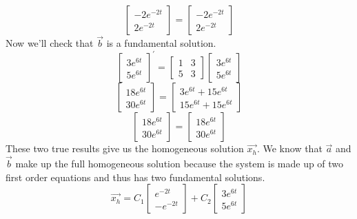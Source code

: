 \begin{equation*}
	\begin{bmatrix}
	-2e^{-2t} \\
	2e^{-2t}
	\end{bmatrix} = \begin{bmatrix}
		-2e^{-2t} \\
		2e^{-2t}
	\end{bmatrix}
\end{equation*}
Now we'll check that $\vec{b}$ is a fundamental solution.
\begin{equation*}
	\begin{bmatrix}
		3e^{6t} \\
		5e^{6t}
	\end{bmatrix}^\prime = \begin{bmatrix}
		1 & 3 \\
		5 & 3
	\end{bmatrix} \begin{bmatrix}
		3e^{6t} \\
		5e^{6t}
	\end{bmatrix}
\end{equation*}
\begin{equation*}
	\begin{bmatrix}
		18e^{6t} \\
		30e^{6t}
	\end{bmatrix} = \begin{bmatrix}
		3e^{6t} + 15e^{6t} \\
		15e^{6t} + 15e^{6t}
	\end{bmatrix}
\end{equation*}
\begin{equation*}
	\begin{bmatrix}
		18e^{6t} \\
		30e^{6t}
	\end{bmatrix} = \begin{bmatrix}
		18e^{6t} \\
		30e^{6t}
	\end{bmatrix}
\end{equation*}
These two true results give us the homogeneous solution $\vec{x_h}$.
We know that $\vec{a}$ and $\vec{b}$ make up the full homogeneous solution because the system is made up of two first order equations and thus has two fundamental solutions.
\begin{equation*}
	\vec{x_h} = C_1\begin{bmatrix}
		e^{-2t} \\
		-e^{-2t}
	\end{bmatrix} + C_2\begin{bmatrix}
		3e^{6t} \\
		5e^{6t}
	\end{bmatrix}
\end{equation*}
